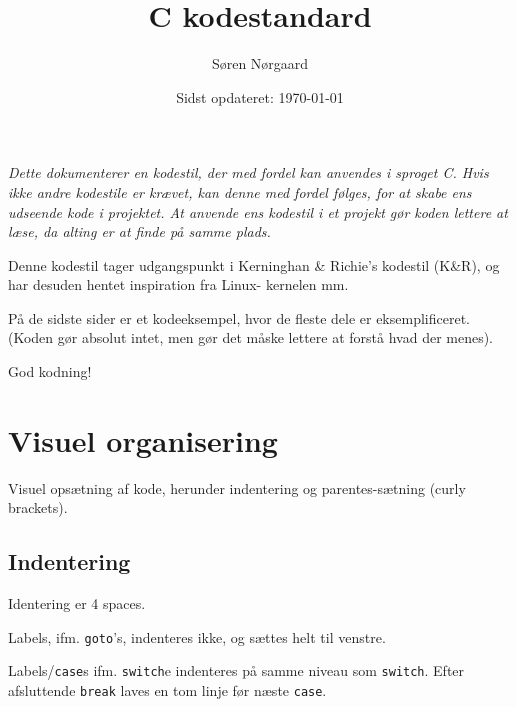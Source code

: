 \documentclass[article, 10pt]{memoir}
\title{C kodestandard}
\author{Søren Nørgaard}
\date{Sidst opdateret: \today}
\let\tempone\itemize
\let\temptwo\enditemize
\renewenvironment{itemize}{\tempone\firmlist}{\temptwo}
\begin{document}
\maketitle
\begin{multicols}{2}

{
    \itshape
    Dette dokumenterer en kodestil, der med fordel kan anvendes i sproget C. Hvis ikke andre kodestile er krævet, kan denne med fordel følges, for at skabe ens udseende kode i projektet. At anvende ens kodestil i et projekt gør koden lettere at læse, da alting er at finde på samme plads.

    Denne kodestil tager udgangspunkt i Kerninghan \& Richie's kodestil (K\&R), og har desuden hentet inspiration fra Linux- kernelen mm.

    På de sidste sider er et kodeeksempel, hvor de fleste dele er eksemplificeret. (Koden gør absolut intet, men gør det måske lettere at forstå hvad der menes).

    God kodning!
}
\tableofcontents

    \chapter{Visuel organisering}
    Visuel opsætning af kode, herunder indentering og parentes-sætning (curly brackets).

    \section{Indentering}
    \begin{itemize}
        \item Identering er 4 spaces.
        \item Labels, ifm. \texttt{goto}'s, indenteres ikke, og sættes helt til venstre.
        \item Labels/\texttt{case}s ifm. \texttt{switch}e indenteres på samme niveau som \texttt{switch}. Efter afsluttende \texttt{break} laves en tom linje før næste \texttt{case}.
    \end{itemize}


\end{multicols}
\end{document}

